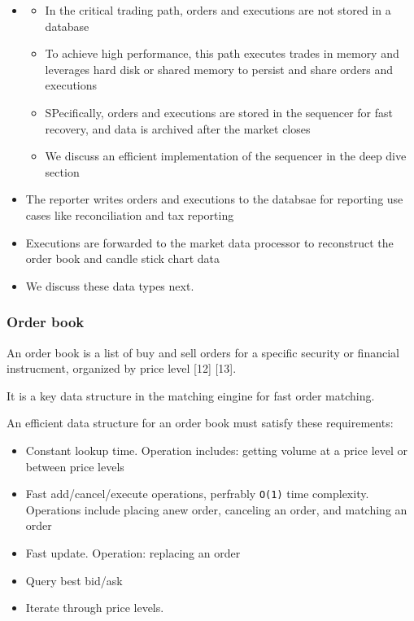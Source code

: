 \documentclass{report}
\theoremstyle{definition}
\let\oldsubsubsection\subsubsection
\renewcommand{\subsubsection}{\oldsubsubsection*}
\begin{document}
\begin{itemize}
\item

\begin{itemize}
\item
In the critical trading path, orders and executions are not stored in a database
\item
To achieve high performance, this path executes trades in memory and leverages hard disk or shared memory to persist and share orders and executions
\item
SPecifically, orders and executions are stored in the sequencer for fast recovery, and data is archived after the market closes
\item
We discuss an efficient implementation of the sequencer in the deep dive section
\end{itemize}
\item
The reporter writes orders and executions to the databsae for reporting use cases like reconciliation and tax reporting
\item
Executions are forwarded to the market data processor to reconstruct the order book and candle stick chart data
\item
We discuss these data types next.
\end{itemize}

\subsubsection{Order book}

An order book is a list of buy and sell orders for a specific security or financial instrucment, organized by price level [12] [13].

It is a key data structure in the matching eingine for fast order matching.

An efficient data structure for an order book must satisfy these requirements:

\begin{itemize}
\item
Constant lookup time. Operation includes: getting volume at a price level or between price levels
\item
Fast add/cancel/execute operations, perfrably \lstinline|O(1)| time complexity. Operations include placing anew order, canceling an order, and matching an order
\item
Fast update. Operation: replacing an order
\item
Query best bid/ask
\item
Iterate through price levels.
\end{itemize}
\end{document}
